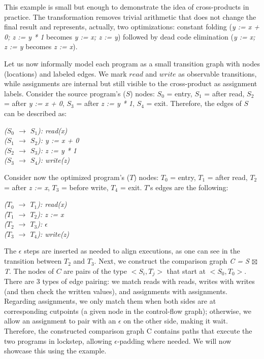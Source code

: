 This example is small but enough to demonstrate the idea of cross-products in practice.
The transformation removes trivial arithmetic that does not change the final result and represents, actually, two optimizations: constant folding (\emph{y := x + 0; z := y * 1} becomes \emph{y := x; z := y}) followed by dead code elimination (\emph{y := x; z := y} becomes \emph{z := x}).

Let us now informally model each program as a small transition graph with nodes (locations) and labeled edges.
We mark $read$ and $write$ as observable transitions, while assignments are internal but still visible to the cross-product as assignment labels.
Consider the source program's ($S$) nodes: $S_0$ = entry, $S_1$ = after read, $S_2$ = after \emph{y := x + 0}, $S_3$ = after \emph{z := y * 1}, $S_4$ = exit.
Therefore, the edges of $S$ can be described as:
\begin{tabbing}
  \emph{($S_0$ $\rightarrow$ $S_1$): read(x)} \\
  \emph{($S_1$ $\rightarrow$ $S_2$): y := x + 0} \\
  \emph{($S_2$ $\rightarrow$ $S_3$): z := y * 1} \\
  \emph{($S_3$ $\rightarrow$ $S_4$): write(z)}
  \label{tabbing:cross_products_transitions_s}
\end{tabbing}

Consider now the optimized program's ($T$) nodes: $T_0$ = entry, $T_1$ = after read, $T_2$ = after \emph{z := x}, $T_3$ = before write, $T_4$ = exit.
$T$'s edges are the following:
\begin{tabbing}
  \emph{($T_0$ $\rightarrow$ $T_1$): read(x)} \\
  \emph{($T_1$ $\rightarrow$ $T_2$): z := x} \\
  \emph{($T_2$ $\rightarrow$ $T_3$): $\epsilon$} \\
  \emph{($T_3$ $\rightarrow$ $T_4$): write(z)}
  \label{tabbing:cross_products_example_transitions_t}
\end{tabbing}

The $\epsilon$ steps are inserted as needed to align executions, as one can see in the transition between $T_2$ and $T_3$.
Next, we construct the comparison graph \emph{C = S $\boxtimes$ T}.
The nodes of $C$ are pairs of the type $<S_i, T_j>$ that start at $<S_0, T_0>$.
There are 3 types of edge pairing: we match reads with reads, writes with writes (and then check the written values), and assignments with assignments.
Regarding assignments, we only match them when both sides are at corresponding cutpoints (a given node in the control-flow graph); otherwise, we allow an assignment to pair with an $\epsilon$ on the other side, making it wait.
Therefore, the constructed comparison graph C contains paths that execute the two programs in lockstep, allowing $\epsilon$-padding where needed.
We will now showcase this using the example.

